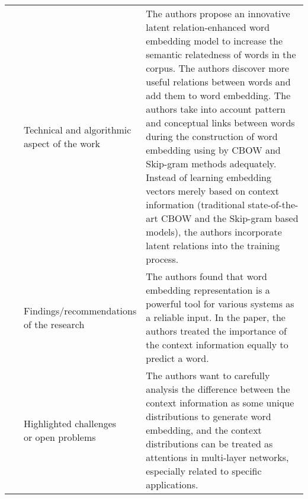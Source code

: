 \begin{landscape}
\begin{longtable}{lp{}p{}}
	\multirow{3}[0]{*}{~\citep{Gao2018}} & 
    \specialcell{Technical and algorithmic \\ aspect of the work} &
    The authors propose an innovative latent relation-enhanced word embedding model to increase the semantic relatedness of words in the corpus. The authors discover more useful relations between words and add them to word embedding. The authors take into account pattern and conceptual links between words during the construction of word embedding using by CBOW and Skip-gram methods adequately. Instead of learning embedding vectors merely based on context information (traditional state-of-the-art CBOW and the Skip-gram based models), the authors incorporate latent relations into the training process.      
    \\ & 
    \specialcell{Findings/recommendations \\ of the research} & 
    The authors found that word embedding representation is a powerful tool for various systems as a reliable input. In the paper, the authors treated the importance of the context information equally to predict a word. 
    \\ & 
    \specialcell{Highlighted challenges \\ or open problems} & 
    The authors want to carefully analysis the difference between the context information as some unique distributions to generate word embedding, and the context distributions can be treated as attentions in multi-layer networks, especially related to specific applications. 
	\\
	

\end{longtable}
\end{landscape}
